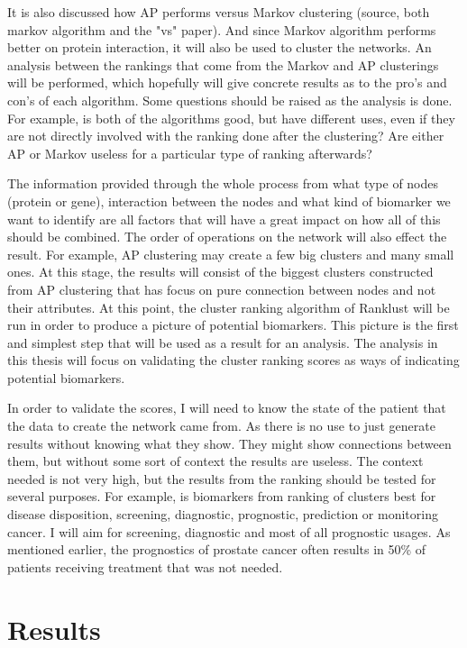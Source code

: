 \documentclass[UKenglish]{ifimaster}
\begin{document}
It is also discussed how AP performs versus Markov clustering (source, both
markov algorithm and the "vs" paper). And since Markov algorithm performs better
on protein interaction, it will also be used to cluster the networks. An
analysis between the rankings that come from the Markov and AP clusterings will
be performed, which hopefully will give concrete results as to the pro's and
con's of each algorithm. Some questions should be raised as the analysis is
done. For example, is both of the algorithms good, but have different uses, even
if they are not directly involved with the ranking done after the clustering?
Are either AP or Markov useless for a particular type of ranking afterwards?

The information provided through the whole process from what type of nodes
(protein or gene), interaction between the nodes and what kind of biomarker we
want to identify are all factors that will have a great impact on how all of
this should be combined. The order of operations on the network will also effect
the result. For example, AP clustering may create a few big clusters and many
small ones. At this stage, the results will consist of the biggest clusters
constructed from AP clustering that has focus on pure connection between nodes
and not their attributes. At this point, the cluster ranking algorithm of
Ranklust will be run in order to produce a picture of potential biomarkers. This
picture is the first and simplest step that will be used as a result for an
analysis. The analysis in this thesis will focus on validating the cluster
ranking scores as ways of indicating potential biomarkers. 

In order to validate the scores, I will need to know the state of the patient
that the data to create the network came from. As there is no use to just
generate results without knowing what they show. They might show connections
between them, but without some sort of context the results are useless. The
context needed is not very high, but the results from the ranking should be
tested for several purposes. For example, is biomarkers from ranking of clusters
best for disease disposition, screening, diagnostic, prognostic, prediction or
monitoring cancer. I will aim for screening, diagnostic and most of all
prognostic usages. As mentioned earlier, the prognostics of prostate cancer
often results in 50\% of patients receiving treatment that was not needed.

\part{Results}
\end{document}
